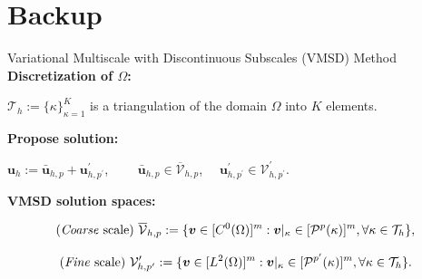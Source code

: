 \documentclass{beamer}
\newcounter{sectionframes}
\newcommand{\setsectionframes}[1]{%
  \setcounter{sectionframes}{#1}%
}
\newcounter{sectionframecount}
\begin{document}
\appendix

\section{Backup}

\setsectionframes{4}


\begin{frame}[t]{Variational Multiscale with Discontinuous Subscales (VMSD) Method}
  \textbf{Discretization of $\Omega$:}

  \vspace{5pt}
  $\mathcal{T}_h := \{\kappa\}_{\kappa = 1}^K$ is a triangulation of the domain $\Omega$ into $K$ elements.


  \vspace{10pt}
  \textbf{Propose solution:}

  $\boldsymbol{u}_h := \bar{\boldsymbol{u}}_{h,p} + \boldsymbol{u}_{h,p^\prime}^\prime$, ~~~~$\bar{\boldsymbol{u}}_{h,p} \in \overline{\mathcal{V}}_{h,p}$,~~ $\boldsymbol{u}^\prime_{h,p^\prime} \in \mathcal{V}^\prime_{h,p^\prime}$.

  \vspace{10pt}
  \textbf{VMSD solution spaces:}

  \vspace{-15pt}
  \begin{equation}
    \text{(\textit{Coarse} scale) } \overline{\mathcal{V}}_{h,p} := \{\boldsymbol{v}\in [C^0(\Omega)]^m : \boldsymbol{v}|_\kappa \in [\mathcal{P}^p(\kappa)]^m, \forall \kappa \in \mathcal{T}_h\},
  \end{equation}

  \vspace{-15pt}
  \begin{equation}
    \text{(\textit{Fine} scale) } \mathcal{V}^\prime_{h,p^\prime} := \{\boldsymbol{v}\in [L^2(\Omega)]^m : \boldsymbol{v}|_\kappa \in [\mathcal{P}^{p^\prime}(\kappa)]^m, \forall \kappa \in \mathcal{T}_h\}.
  \end{equation}

\end{frame}


\end{document}
